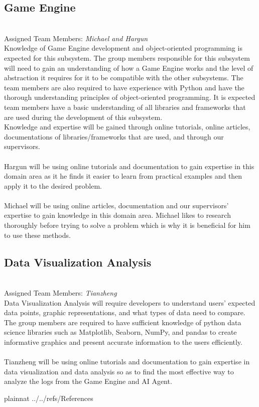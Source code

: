 \documentclass[12pt]{article}
\begin{document}
\subsection{Game Engine}
\\
Assigned Team Members: \textit{Michael and Hargun}
\\
Knowledge of Game Engine development and object-oriented programming is expected for this subsystem. The group members responsible for this subsystem will need to gain an understanding of how a Game Engine works and the level of abstraction it requires for it to be compatible with the other subsystems. The team members are also required to have experience with Python and have the thorough understanding principles of object-oriented programming. It is expected team members have a basic understanding of all libraries and frameworks that are used during the development of this subsystem. 
\\Knowledge and expertise will be gained through online tutorials, online articles, documentations of libraries/frameworks that are used, and through our supervisors.
\\\\Hargun will be using online tutorials and documentation to gain expertise in this domain area as it he finds it easier to learn from practical examples and then apply it to the desired problem.
\\\\Michael will be using online articles, documentation and our supervisors' expertise to gain knowledge in this domain area. Michael likes to research thoroughly before trying to solve a problem which is why it is beneficial for him to use these methods.


\subsection{Data Visualization Analysis}
\\
Assigned Team Members: \textit{Tianzheng}
\\
Data Visualization Analysis will require developers to understand users' expected data points, graphic representations, and what types of data need to compare. The group members are required to have sufficient knowledge of python data science libraries such as Matplotlib, Seaborn, NumPy, and pandas to create informative graphics and present accurate information to the users efficiently. 
\\\\
Tianzheng will be using online tutorials and documentation to gain expertise in data visualization and data analysis so as to find the most effective way to analyze the logs from the Game Engine and AI Agent. 
\newpage

 {plainnat}
 {../../refs/References}
\end{document}
